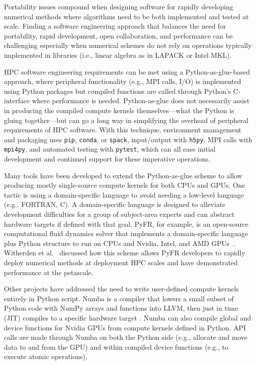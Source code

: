 Portability issues compound when designing software for rapidly developing numerical methods where algorithms need to be both implemented and tested at scale.
Finding a software engineering approach that balances the need for portability, rapid development, open collaboration, and performance can be challenging especially when numerical schemes do not rely on operations typically implemented in libraries (i.e., linear algebra as in LAPACK or Intel MKL). 

HPC software engineering requirements can be met using a Python-as-glue-based approach, where peripheral functionality (e.g., MPI calls, I/O) is implemented using Python packages but compiled functions are called through Python's C-interface where performance is needed.
Python-as-glue does not necessarily assist in producing the compiled compute kernels themselves---what the Python is gluing together---but can go a long way in simplifying the overhead of peripheral requirements of HPC software.
With this technique, environment management and packaging uses \texttt{pip}, \texttt{conda}, or \texttt{spack}, input/output with \texttt{h5py}, MPI calls with \texttt{mpi4py}, 
and automated testing with \texttt{pytest}, which can all ease initial development and continued support for these imperative operations. 

Many tools have been developed to extend the Python-as-glue scheme to allow producing mostly single-source compute kernels for both CPUs and GPUs.
One tactic is using a domain-specific language to avoid needing a low-level language (e.g., FORTRAN, C).
A domain-specific language is designed to alleviate development difficulties for a group of subject-area experts and can abstract hardware targets if defined with that goal.
PyFR, for example, is an open-source computational fluid dynamics solver that implements a domain-specific language plus Python structure to run on CPUs and Nvidia, Intel, and AMD GPUs~\cite{pyfrPetascale}. 
Witherden et al.~\cite{pyfrPetascale} discussed how this scheme allows PyFR developers to rapidly deploy numerical methods at deployment HPC scales and have demonstrated performance at the petascale.

Other projects have addressed the need to write user-defined compute kernels entirely in Python script.
Numba is a compiler that lowers a small subset of Python code with NumPy arrays and functions into LLVM, then just in time (JIT) compiles to a specific hardware target \cite{lam_numba_2015}. 
Numba can also compile global and device functions for Nvidia GPUs from compute kernels defined in Python.
API calls are made through Numba on both the Python side (e.g., allocate and move data to and from the GPU) and within compiled device functions (e.g., to execute atomic operations).

